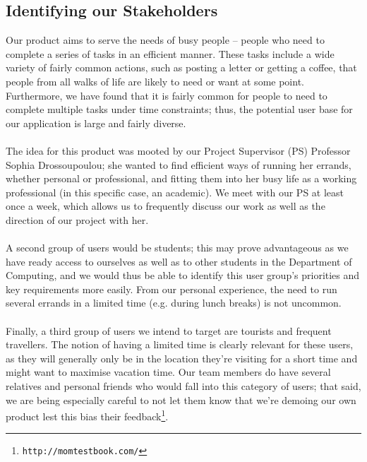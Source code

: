 \documentclass[a4paper, 10pt]{article}
\begin{document}
\subsection{Identifying our Stakeholders}
Our product aims to serve the needs of busy people -- people who need to complete a series of tasks in an efficient manner. These tasks include a wide variety of fairly common actions, such as posting a letter or getting a coffee, that people from all walks of life are likely to need or want at some point. Furthermore, we have found that it is fairly common for people to need to complete multiple tasks under time constraints; thus, the potential user base for our application is large and fairly diverse.\\\\
The idea for this product was mooted by our Project Supervisor (PS) Professor Sophia Drossoupoulou; she wanted to find efficient ways of running her errands, whether personal or professional, and fitting them into her busy life as a working professional (in this specific case, an academic). We meet with our PS at least once a week, which allows us to frequently discuss our work as well as the direction of our project with her.\\\\
A second group of users would be students; this may prove advantageous as we have ready access to ourselves as well as to other students in the Department of Computing, and we would thus be able to identify this user group's priorities and key requirements more easily.  From our personal experience, the need to run several errands in a limited time (e.g. during lunch breaks) is not uncommon. \\\\
Finally, a third group of users we intend to target are tourists and frequent travellers. The notion of having a limited time is clearly relevant for these users, as they will generally only be in the location they're visiting for a short time and might want to maximise vacation time. Our team members do have several relatives and personal friends who would fall into this category of users; that said, we are being especially careful to not let them know that we're demoing our own product lest this bias their feedback\footnote{\texttt{http://momtestbook.com/}}.
\newpage
\end{document}
